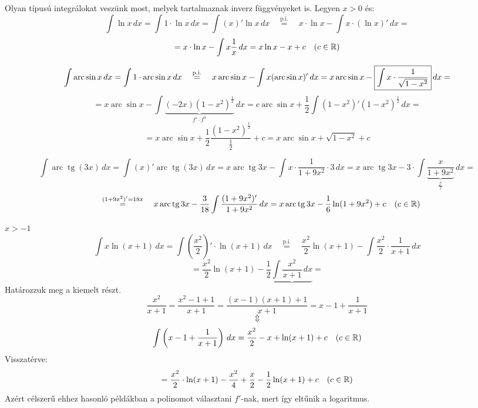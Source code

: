 \documentclass[a4paper,11.5pt]{article}
\DeclareMathOperator{\tg}{tg}
\DeclareMathOperator{\arc}{arc}
\begin{document}
	\begin{task}
		Olyan típusú integrálokat veszünk most, melyek tartalmaznak inverz függvényeket is. Legyen $x>0$ és:
		\[ \int \ln x\,dx=\int1\cdot\ln x\,dx=\int (x)'\ln x\,dx\quad \overset{\text{p.i.}}{=}\quad x\cdot\ln x-\int x\cdot(\ln x)'\,dx=\]
		\[=x\cdot\ln x-\int x\frac{1}{x}\,dx=x\ln x-x+c\quad (c\in\mathbb{R}) \]
	\end{task}
	\begin{task}
		\[ \int \arc\sin x\,dx=\int 1\cdot\arc\sin x\,dx\quad \overset{\text{p.i.}}{=}\quad x\arc\sin x-\int x(\arc\sin x)'\,dx=x\arc\sin x-\text{\fbox{$\displaystyle \int x\cdot\frac{1}{\sqrt{1-x^2}}$}}\,dx= \]
		\[= x\arc\sin x-\int\underbrace{(-2x)(1-x^2)^{\frac{1}{2}}}_{f'\cdot f^\alpha}\,dx=c\arc\sin x+\frac{1}{2}\int(1-x^2)'(1-x^2)^{\frac{1}{2}}\,dx=\]
		\[=x\arc\sin x+\frac{1}{2}\frac{(1-x^2)^{\frac{1}{2}}}{\frac{1}{2}}+c=x\arc\sin x+\sqrt{1-x^2}+c \]
	\end{task}
	\begin{task}
		\[ \int\arc\tg(3x)\,dx=\int(x)'\arc\tg(3x)\,dx =x \arc\tg3x-\int x\cdot\frac{1}{1+9x^2}\cdot3\,dx=x\arc\tg3x-3\cdot\int\underbrace{\frac{x}{1+9x^2}}_{\frac{f'}{f}}\,dx=\]
		\[\quad \overset{(1+9x^2)'=18x}{=}\quad x\arc\tg3x-\frac{3}{18}\int\frac{(1+9x^2)'}{1+9x^2}\,dx=x\arc\tg3x-\frac{1}{6}\ln(1+9x^2)+c\quad (c\in\R) \]
	\end{task}
	\begin{task}$x>-1$
		\[ \int x\ln(x+1)\,dx=\int \left(\frac{x^2}{2}\right)'\cdot\ln(x+1)\,dx\quad \overset{\text{p.i.}}{=}\quad \frac{x^2}{2}\ln(x+1)-\int\frac{x^2}{2}\cdot\frac{1}{x+1}\,dx\]
		\[=\frac{x^2}{2}\ln(x+1)-\frac{1}{2}\underbrace{\int\frac{x^2}{x+1}\,dx}=\]
		Határozzuk meg a kiemelt részt.
		\[\frac{x^2}{x+1}=\frac{x^2-1+1}{x+1}=\frac{(x-1)(x+1)+1}{x+1}=x-1+\frac{1}{x+1}\]
		\[  \Updownarrow\]
		\[ \int\left(x-1+\frac{1}{x+1}\right)\,dx=\frac{x^2}{2}-x+\ln(x+1)+c \quad (c\in\mathbb{R})\]
		Visszatérve:
		\[ =\frac{x^2}{2}\cdot\ln(x+1)-\frac{x^2}{4}+\frac{x}{2}-\frac{1}{2}\ln(x+1)+c\quad (c\in\mathbb{R}) \]
		Azért célszerű ehhez hasonló példákban a polinomot választani $f'$-nak, mert így eltűnik a logaritmus.
	\end{task}
\end{document}
